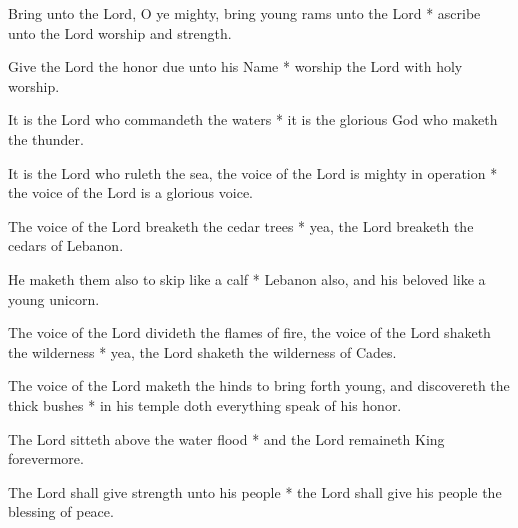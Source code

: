 Bring unto the Lord, O ye mighty, bring young rams unto the Lord * ascribe unto the Lord worship and strength.

Give the Lord the honor due unto his Name * worship the Lord with holy worship.

It is the Lord who commandeth the waters * it is the glorious God who maketh the thunder.

It is the Lord who ruleth the sea, the voice of the Lord is mighty in operation * the voice of the Lord is a glorious voice.

The voice of the Lord breaketh the cedar trees * yea, the Lord breaketh the cedars of Lebanon.

He maketh them also to skip like a calf * Lebanon also, and his beloved like a young unicorn.

The voice of the Lord divideth the flames of fire, the voice of the Lord shaketh the wilderness * yea, the Lord shaketh the wilderness of Cades.

The voice of the Lord maketh the hinds to bring forth young, and discovereth the thick bushes * in his temple doth everything speak of his honor.

The Lord sitteth above the water flood * and the Lord remaineth King forevermore.

The Lord shall give strength unto his people * the Lord shall give his people the blessing of peace.
